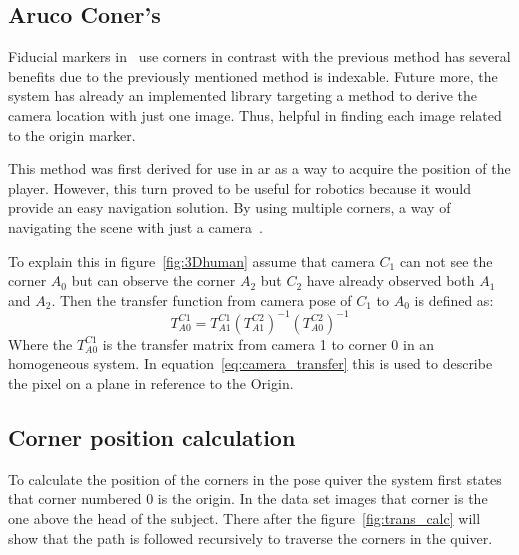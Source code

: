 \subsection{Aruco Coner's}%
\label{sub:ArucoConers}
Fiducial markers in~\cite{romero2018speeded} use \aruco corners in contrast with the previous method has several benefits due to the previously mentioned method is indexable.
Future more, the system has already an implemented library targeting a method to derive the camera location with just one image.
Thus, helpful in finding each image related to the origin \aruco marker.

This method was first derived for use in \ac{ar} as a way to acquire the position of the player.
However, this turn proved to be useful for robotics because it would provide an easy navigation solution.
By using multiple \aruco corners, a way of navigating the scene with just a camera~\cite{zheng2018vlocaruco}.

\par To explain this in figure~\ref{fig:3Dhuman} assume that camera $C_1$ can not see the corner $A_0$ but can observe the corner $A_2$ but $C_2$ have already observed both $A_1$ and $A_2$. Then the transfer function from camera pose of $C_1$ to $A_0$ is defined as:
\begin{equation}
    T^{C1}_{A0} = T^{C1}_{A1} (T^{C2}_{A1})^{-1}(T^{C2}_{A0})^{-1}
\end{equation}
Where the $T^{C1}_{A0}$ is the transfer matrix from camera 1 to \aruco corner 0 in an homogeneous system.
In equation~\ref{eq:camera_transfer} this is used to describe the pixel on a plane in reference to the Origin.


\subsection{Corner position calculation}%
\label{sub:corner_pos_calc}
To calculate the position of the corners in the pose quiver the system first states that \aruco corner numbered 0 is the origin.
In the data set images that corner is the one above the head of the subject.
There after the figure~\ref{fig:trans_calc} will show that the path is followed recursively to traverse the corners in the quiver.







